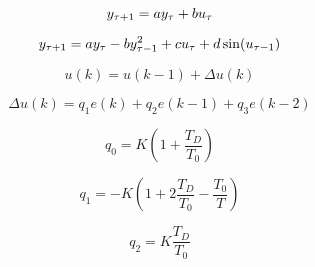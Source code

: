 \documentclass{article}
\begin{document}
\[\Large y_{\tau+1} = a y_{\tau} + b u_{\tau}
\]
\pagebreak

\[\Large y_{\tau+1}=ay_{\tau}-by_{\tau-1}^2+cu_{\tau}+d\sin(u_{\tau-1})
\]
\pagebreak

\[u(k) = u(k - 1) + \Delta u(k)
\]
\pagebreak

\[\Delta u(k) = q_1 e(k) + q_2 e(k - 1) + q_3 e(k - 2)
\]
\pagebreak

\[q_0 = K \left( 1 + \frac{T_D}{T_0} \right)
\]
\pagebreak

\[q_1 = -K \left( 1 + 2 \frac{T_D}{T_0} - \frac{T_0}{T} \right)
\]
\pagebreak

\[q_2 = K \frac{T_D}{T_0}
\]
\pagebreak
\end{document}
